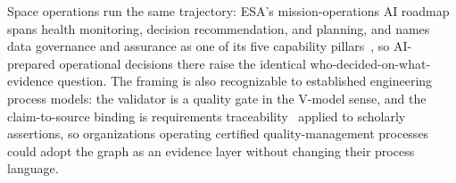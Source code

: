 Space operations run the same trajectory: ESA's mission-operations
AI roadmap spans health monitoring, decision recommendation, and
planning, and names data governance and assurance as one of its five
capability pillars~\cite{esa-a2i-roadmap}, so AI-prepared operational
decisions there raise the identical who-decided-on-what-evidence
question. The framing is also recognizable to established
engineering process models: the validator is a quality gate in the
V-model sense, and the claim-to-source binding is requirements
traceability~\cite{traceability1994} applied to scholarly
assertions, so organizations operating certified quality-management
processes could adopt the graph as an evidence layer without
changing their process language.
